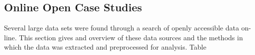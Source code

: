 \subsection{Online Open Case Studies}

Several large data sets were found through a search of openly accessible data on-line. This section gives and overview of these data sources and the methods in which the data was extracted and preprocessed for analysis. Table 

